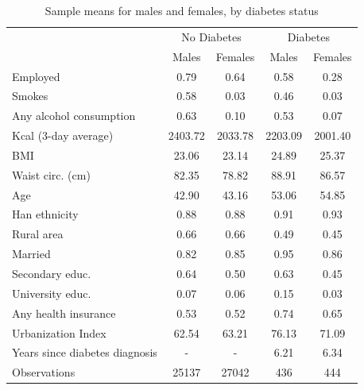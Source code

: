 \begin{table}[h]
\caption{\label{tab:descriptives_diab}Sample means for males and females, by diabetes status}
\begin{center}
\begin{adjustbox}{max width=\linewidth}  
{
\def\sym#1{\ifmmode^{#1}\else\(^{#1}\)\fi}
\begin{tabular}{l*{4}{c}}
\toprule
                    &\multicolumn{2}{c}{No Diabetes}&\multicolumn{2}{c}{Diabetes}\\\cmidrule(lr){2-3}\cmidrule(lr){4-5}
                    &\multicolumn{1}{c}{Males}&\multicolumn{1}{c}{Females}&\multicolumn{1}{c}{Males}&\multicolumn{1}{c}{Females}\\
\midrule
Employed            &        0.79&        0.64&        0.58&        0.28\\
Smokes              &        0.58&        0.03&        0.46&        0.03\\
Any alcohol consumption&        0.63&        0.10&        0.53&        0.07\\
Kcal (3-day average)&     2403.72&     2033.78&     2203.09&     2001.40\\
\ac{BMI}                 &       23.06&       23.14&       24.89&       25.37\\
Waist circ. (cm)    &       82.35&       78.82&       88.91&       86.57\\
Age                 &       42.90&       43.16&       53.06&       54.85\\
Han ethnicity       &        0.88&        0.88&        0.91&        0.93\\
Rural area          &        0.66&        0.66&        0.49&        0.45\\
Married             &        0.82&        0.85&        0.95&        0.86\\
Secondary educ.     &        0.64&        0.50&        0.63&        0.45\\
University educ.    &        0.07&        0.06&        0.15&        0.03\\
Any health insurance&        0.53&        0.52&        0.74&        0.65\\
Urbanization Index  &       62.54&       63.21&       76.13&       71.09\\
Years since diabetes diagnosis&        -&        -&        6.21&        6.34\\
\midrule
Observations        &       25137&       27042&         436&         444\\
\bottomrule
\end{tabular}
}
\end{adjustbox}
\end{center}
\end{table}
\FloatBarrier

